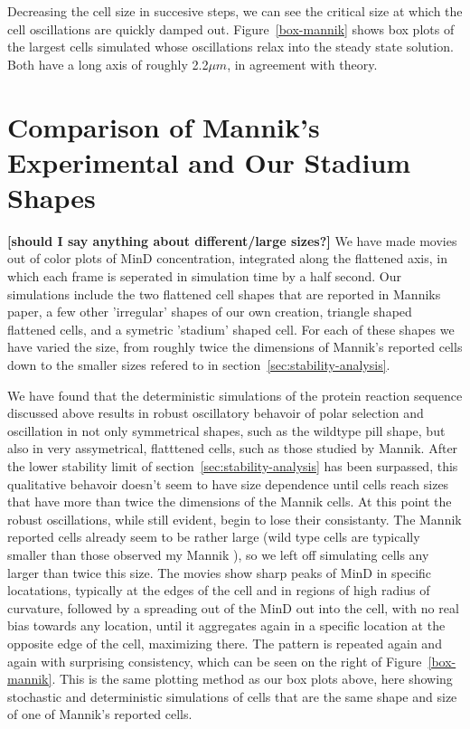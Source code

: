 \documentclass[letterpaper,twocolumn,amsmath,amssymb,pre]{revtex4-1}
\newcommand{\red}[1]{{\bf \color{red} #1}}
\newcommand{\fixme}[1]{\red{[#1]}}
\begin{document}
Decreasing the cell size in succesive steps, we can see the critical
size at which the cell oscillations are quickly damped out.
Figure~\ref{box-mannik} shows box plots of the largest cells simulated
whose oscillations relax into the steady state solution.  Both have a
long axis of roughly 2.2$\mu m$, in agreement with theory.

\section{Comparison of Mannik's Experimental and Our Stadium Shapes}
\fixme{should I say anything about different/large sizes?}  We have
made movies out of color plots of MinD concentration, integrated along
the flattened axis, in which each frame is seperated in simulation
time by a half second. Our simulations include the two flattened cell
shapes that are reported in Manniks paper, a few other 'irregular'
shapes of our own creation, triangle shaped flattened cells, and a
symetric 'stadium' shaped cell. For each of these shapes we have
varied the size, from roughly twice the dimensions of Mannik's
reported cells down to the smaller sizes refered to in
section~\ref{sec:stability-analysis}.

We have found that the deterministic simulations of the protein
reaction sequence discussed above results in robust oscillatory
behavoir of polar selection and oscillation in not only symmetrical
shapes, such as the wildtype pill shape, but also in very
assymetrical, flatttened cells, such as those studied by Mannik.
After the lower stability limit of
section~\ref{sec:stability-analysis} has been surpassed, this
qualitative behavoir doesn't seem to have size dependence until cells
reach sizes that have more than twice the dimensions of the Mannik
cells.  At this point the robust oscillations, while still evident,
begin to lose their consistanty.  The Mannik reported cells already
seem to be rather large (wild type cells are typically smaller than
those observed my Mannik
\cite{kubitschek1990cell,kubitschek1968linear,mannik2012robustness}),
so we left off simulating cells any larger than twice this size. The
movies show sharp peaks of MinD in specific locatations, typically at
the edges of the cell and in regions of high radius of curvature,
followed by a spreading out of the MinD out into the cell, with no
real bias towards any location, until it aggregates again in a
specific location at the opposite edge of the cell, maximizing there.
The pattern is repeated again and again with surprising consistency,
which can be seen on the right of Figure~\ref{box-mannik}.  This is
the same plotting method as our box plots above, here showing
stochastic and deterministic simulations of cells that are the same
shape and size of one of Mannik's reported cells.
\end{document}
